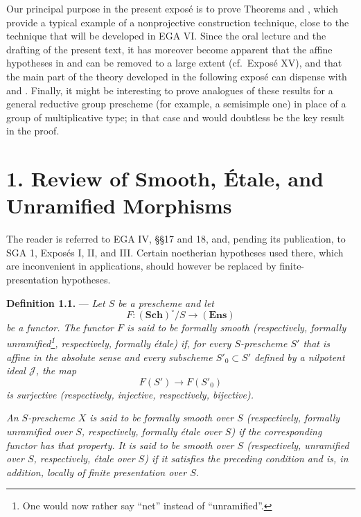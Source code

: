Our principal purpose in the present exposé is to prove Theorems 
and , which provide a typical example of a nonprojective
construction technique, close to the technique that will be developed
in EGA VI.  Since the oral lecture and the drafting of the present
text, it has moreover become apparent that the affine hypotheses in
 and  can be removed to a large extent (cf.\ Exposé XV), and
that the main part of the theory developed in the following exposé can
dispense with  and .  Finally, it might be interesting to prove
analogues of these results for a general reductive group prescheme
(for example, a semisimple one) in place of a group of multiplicative
type; in that case  and  would doubtless be the key result in the
proof.

\section*{1. Review of Smooth, Étale,
and Unramified Morphisms}

The reader is referred to EGA IV, §§17 and 18, and, pending its
publication, to SGA 1, Exposés I, II, and III.  Certain noetherian
hypotheses used there, which are inconvenient in applications, should
however be replaced by finite-presentation hypotheses.

\medskip
\noindent{}\textbf{Definition 1.1.} ---
\textit{Let \(S\) be a prescheme and let
\[
  F:(\mathbf{Sch})^\circ/S\longrightarrow(\mathbf{Ens})
\]
be a functor.  The functor \(F\) is said to be \emph{formally smooth}
(respectively, \emph{formally unramified}\footnote{One would now rather say ``net'' instead of
``unramified''.},
respectively, \emph{formally étale}) if, for every \(S\)-prescheme
\(S'\) that is affine in the absolute sense and every subscheme
\(S'_0\subset S'\) defined by a nilpotent ideal \(\mathscr J\), the map
\[
  F(S')\longrightarrow F(S'_0)
\]
is surjective (respectively, injective, respectively, bijective).}

\textit{An \(S\)-prescheme \(X\) is said to be formally smooth over
\(S\) (respectively, formally unramified over \(S\), respectively,
formally étale over \(S\)) if the corresponding functor has that
property.  It is said to be smooth over \(S\) (respectively,
unramified over \(S\), respectively, étale over \(S\)) if it satisfies
the preceding condition and is, in addition, locally of finite
presentation over \(S\).}

